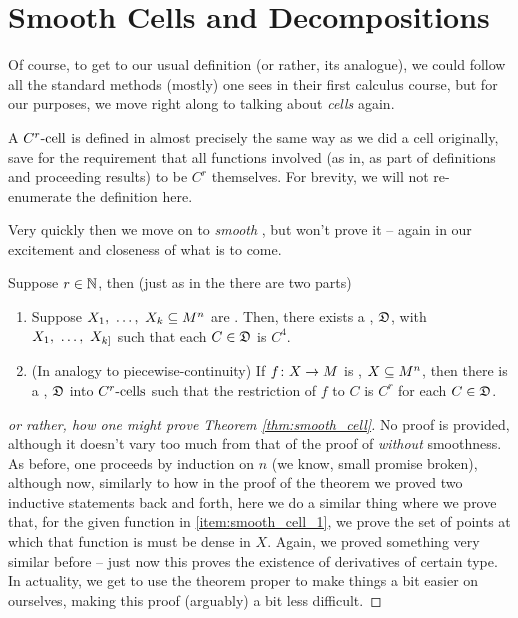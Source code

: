 
\section{Smooth Cells and Decompositions}

Of course, to get to our usual definition (or rather, its analogue), we could follow all the standard methods (mostly) one sees in their first calculus course, but for our purposes, we move right along to talking about \emph{cells} again.

\begin{definition}[$C^r$-cells]
A $\Crcell[r]$ is defined in almost precisely the same way as we did a cell originally, save for the requirement that all functions involved (as in, as part of definitions and proceeding results) to be $C^r$ themselves. For brevity, we will not re-enumerate the definition here.
\end{definition}

Very quickly then we move on to \emph{smooth} \cd, but won't prove it -- again in our excitement and closeness of what is to come.

\begin{theorem}
  Suppose $r \in \N$, then (just as in the \CDt there are two parts)
    \begin{enumerate}
      \item \label{item:smooth_cell_1} Suppose $\vonevm{X}{k} \subseteq M^n$ are . Then, there exists a \cd, $\fancyD$, \cmptble with $\vonevm{X}{k]}$ such that each $C \in \fancyD$ is $C^4$.

      \item \label{item:smooth_cell_2} (In analogy to piecewise-continuity) If $\funcdom{f}{X}{M}$ is , $\XMn[X]{n}$, then there is a \cd, $\fancyD$ into $\Crcells$ such that the restriction of $f$ to $C$ is $C^r$ for each $C \in \fancyD$.
    \end{enumerate}

  \label{thm:smooth_cell}
\end{theorem}

\begin{proof}[or rather, how one might prove Theorem \ref{thm:smooth_cell}]
  No proof is provided, although it doesn't vary too much from that of the proof of \CD \emph{without} smoothness. As before, one proceeds by induction on $n$ (we know, small promise broken), although now, similarly to how in the proof of the \CD theorem we proved two inductive statements back and forth, here we do a similar thing where we prove that, for the given function in \ref {item:smooth_cell_1}, we prove the set of points at which that function is \cont must be dense in $X$. Again, we proved something very similar before -- just now this proves the existence of derivatives of certain type. In actuality, we get to use the \CD theorem proper to make things a bit easier on ourselves, making this proof (arguably) a bit less difficult.
\end{proof}


